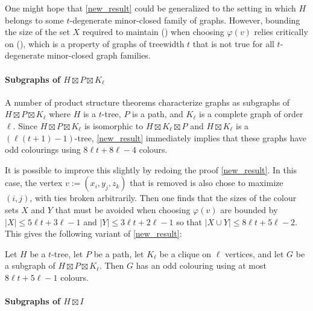 \documentclass{patmorin}
\begin{document}
One might hope that \cref{new_result} could be generalized to the setting in which $H$ belongs to some $t$-degenerate minor-closed family of graphs.  However, bounding the size of the set $X$ required to maintain () when choosing $\varphi(v)$ relies critically on (), which is a property of graphs of treewidth $t$ that is not true for all $t$-degenerate minor-closed graph families.

\paragraph{Subgraphs of $H\boxtimes P\boxtimes K_\ell$}

A number of product structure theorems characterize graphs as subgraphs of $H\boxtimes P\boxtimes K_{\ell}$ where $H$ is a $t$-tree, $P$ is a path, and $K_\ell$ is a complete graph of order $\ell$.  Since $H\boxtimes P\boxtimes K_{\ell}$ is isomorphic to $H\boxtimes K_\ell\boxtimes P$ and $H\boxtimes K_\ell$ is a $(\ell(t+1)-1)$-tree, \cref{new_result} immediately implies that these graphs have odd colourings using $8\ell t+8\ell-4$ colours.

It is possible to improve this slightly by redoing the proof \cref{new_result}.  In this case, the vertex $v:=(x_i,y_j,z_k)$ that is removed is also chose to maximize $(i,j)$, with ties broken arbitrarily. Then one finds that the sizes of the colour sets $X$ and $Y$ that must be avoided when choosing $\varphi(v)$ are bounded by $|X|\le 5\ell t + 3\ell-1$ and $|Y|\le 3\ell t + 2\ell -1$ so that $|X\cup Y|\le 8\ell t + 5\ell -2$. This gives the following variant of \cref{new_result}:

\begin{thm}\label{new_result_kl}
  Let $H$ be a $t$-tree, let $P$ be a path, let $K_\ell$ be a clique on $\ell$ vertices, and let $G$ be a subgraph of $H\boxtimes P\boxtimes K_\ell$.  Then $G$ has an odd colouring using at most $8\ell t + 5\ell -1$ colours.
\end{thm}

\paragraph{Subgraphs of $H\boxtimes I$}
\end{document}

